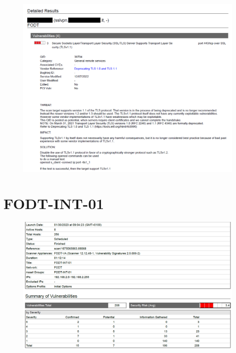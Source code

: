 \documentclass[target=bach,aauheader=]{thud}
\begin{document}
\pagebreak

\begin{figure}[h]
    \centering
    \includegraphics[width=1\linewidth]{images/FODT-EXT-01_2.png}
    \caption{}
    \label{fig:fodt-ext-01_2}
\end{figure}

\pagebreak

\section{FODT-INT-01}

\begin{figure}[h]
    \centering
    \includegraphics[width=1\linewidth]{images/FODT-INT-01_1.png}
    \caption{}
    \label{fig:fodt-int-01_1}
\end{figure}
\end{document}
